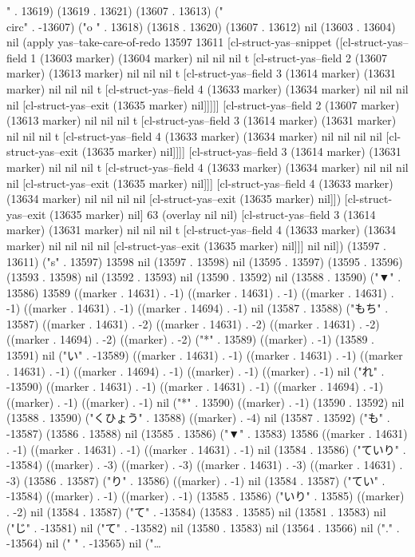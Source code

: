 {" . 13619) (13619 . 13621) (13607 . 13613) ("\\circ" . -13607) ("o
" . 13618) (13618 . 13620) (13607 . 13612) nil (13603 . 13604) nil (apply yas--take-care-of-redo 13597 13611 [cl-struct-yas--snippet ([cl-struct-yas--field 1 (13603 marker) (13604 marker) nil nil nil t [cl-struct-yas--field 2 (13607 marker) (13613 marker) nil nil nil t [cl-struct-yas--field 3 (13614 marker) (13631 marker) nil nil nil t [cl-struct-yas--field 4 (13633 marker) (13634 marker) nil nil nil nil [cl-struct-yas--exit (13635 marker) nil]]]]] [cl-struct-yas--field 2 (13607 marker) (13613 marker) nil nil nil t [cl-struct-yas--field 3 (13614 marker) (13631 marker) nil nil nil t [cl-struct-yas--field 4 (13633 marker) (13634 marker) nil nil nil nil [cl-struct-yas--exit (13635 marker) nil]]]] [cl-struct-yas--field 3 (13614 marker) (13631 marker) nil nil nil t [cl-struct-yas--field 4 (13633 marker) (13634 marker) nil nil nil nil [cl-struct-yas--exit (13635 marker) nil]]] [cl-struct-yas--field 4 (13633 marker) (13634 marker) nil nil nil nil [cl-struct-yas--exit (13635 marker) nil]]) [cl-struct-yas--exit (13635 marker) nil] 63 (overlay nil nil) [cl-struct-yas--field 3 (13614 marker) (13631 marker) nil nil nil t [cl-struct-yas--field 4 (13633 marker) (13634 marker) nil nil nil nil [cl-struct-yas--exit (13635 marker) nil]]] nil nil]) (13597 . 13611) ("s" . 13597) 13598 nil (13597 . 13598) nil (13595 . 13597) (13595 . 13596) (13593 . 13598) nil (13592 . 13593) nil (13590 . 13592) nil (13588 . 13590) ("▼" . 13586) 13589 ((marker . 14631) . -1) ((marker . 14631) . -1) ((marker . 14631) . -1) ((marker . 14631) . -1) ((marker . 14694) . -1) nil (13587 . 13588) ("もち" . 13587) ((marker . 14631) . -2) ((marker . 14631) . -2) ((marker . 14631) . -2) ((marker . 14694) . -2) ((marker) . -2) ("*" . 13589) ((marker) . -1) (13589 . 13591) nil ("い" . -13589) ((marker . 14631) . -1) ((marker . 14631) . -1) ((marker . 14631) . -1) ((marker . 14694) . -1) ((marker) . -1) ((marker) . -1) nil ("れ" . -13590) ((marker . 14631) . -1) ((marker . 14631) . -1) ((marker . 14694) . -1) ((marker) . -1) ((marker) . -1) nil ("*" . 13590) ((marker) . -1) (13590 . 13592) nil (13588 . 13590) ("くひょう" . 13588) ((marker) . -4) nil (13587 . 13592) ("も" . -13587) (13586 . 13588) nil (13585 . 13586) ("▼" . 13583) 13586 ((marker . 14631) . -1) ((marker . 14631) . -1) ((marker . 14631) . -1) nil (13584 . 13586) ("ていり" . -13584) ((marker) . -3) ((marker) . -3) ((marker . 14631) . -3) ((marker . 14631) . -3) (13586 . 13587) ("り" . 13586) ((marker) . -1) nil (13584 . 13587) ("てい" . -13584) ((marker) . -1) ((marker) . -1) (13585 . 13586) ("いり" . 13585) ((marker) . -2) nil (13584 . 13587) ("て" . -13584) (13583 . 13585) nil (13581 . 13583) nil ("じ" . -13581) nil ("て" . -13582) nil (13580 . 13583) nil (13564 . 13566) nil ("." . -13564) nil (" " . -13565) nil ("…
}
